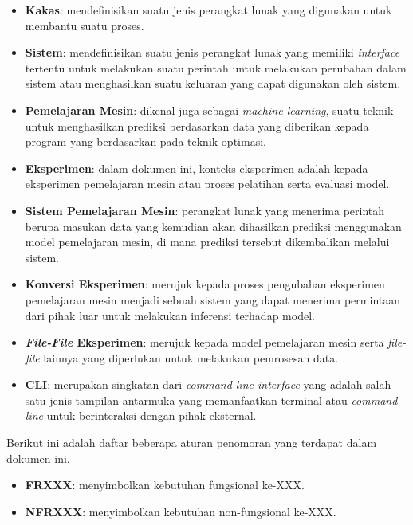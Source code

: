 \begin{itemize}
    \item \textbf{Kakas}: mendefinisikan suatu jenis perangkat lunak yang digunakan untuk membantu suatu proses.
    \item \textbf{Sistem}: mendefinisikan suatu jenis perangkat lunak yang memiliki \textit{interface} tertentu untuk melakukan suatu perintah untuk melakukan perubahan dalam sistem atau menghasilkan suatu keluaran yang dapat digunakan oleh sistem.
    \item \textbf{Pemelajaran Mesin}: dikenal juga sebagai \textit{machine learning}, suatu teknik untuk menghasilkan prediksi berdasarkan data yang diberikan kepada program yang berdasarkan pada teknik optimasi.
    \item \textbf{Eksperimen}: dalam dokumen ini, konteks eksperimen adalah kepada eksperimen pemelajaran mesin atau proses pelatihan serta evaluasi model.
    \item \textbf{Sistem Pemelajaran Mesin}: perangkat lunak yang menerima perintah berupa masukan data yang kemudian akan dihasilkan prediksi menggunakan model pemelajaran mesin, di mana prediksi tersebut dikembalikan melalui sistem.
    \item \textbf{Konversi Eksperimen}: merujuk kepada proses pengubahan eksperimen pemelajaran mesin menjadi sebuah sistem yang dapat menerima permintaan dari pihak luar untuk melakukan inferensi terhadap model.
    \item \textbf{\textit{File-File} Eksperimen}: merujuk kepada model pemelajaran mesin serta \textit{file-file} lainnya yang diperlukan untuk melakukan pemrosesan data.
    \item \textbf{CLI}: merupakan singkatan dari \textit{command-line interface} yang adalah salah satu jenis tampilan antarmuka yang memanfaatkan terminal atau \textit{command line} untuk berinteraksi dengan pihak eksternal.
\end{itemize}


Berikut ini adalah daftar beberapa aturan penomoran yang terdapat dalam dokumen ini.
\begin{itemize}
    \item \textbf{FRXXX}: menyimbolkan kebutuhan fungsional ke-XXX.
    \item \textbf{NFRXXX}: menyimbolkan kebutuhan non-fungsional ke-XXX.
\end{itemize}


